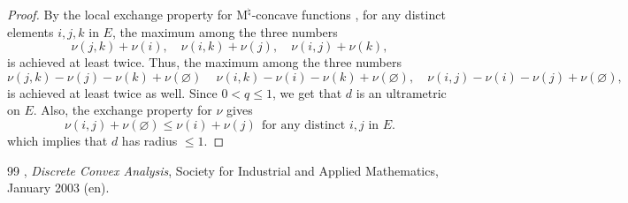 \documentclass[10pt,a4paper]{amsart}
\newcommand{\Mnat}{$\text{M}^\natural$}
\begin{document}
\begin{proof}
  By the local exchange property for \Mnat-concave functions \cite[Theorem 6.4]{Mu03}, for any distinct elements $i,j,k$ in $E$, the maximum among the three numbers
  \[
    \nu(j,k)+\nu(i), \quad \nu(i,k)+\nu(j), \quad \nu(i,j)+\nu(k),
  \]
  is achieved at least twice. Thus, the maximum among the three numbers
  \[
    \nu(j,k) -\nu(j)-\nu(k) + \nu(\varnothing)\, \quad \nu(i,k) -\nu(i)-\nu(k) + \nu(\varnothing), \quad \nu(i,j) -\nu(i)-\nu(j) + \nu(\varnothing),
  \]
  is achieved at least twice as well. Since $0 < q \leq 1$, we get that $d$ is an ultrametric on $E$. 
  Also, the exchange property for $\nu$ gives
  \[
\nu(i,j)+\nu(\varnothing) \le \nu(i)+\nu(j) \ \ \text{for any distinct $i, j$ in $E$.}
  \]
which implies that $d$ has radius $\le 1$.
\end{proof}

\begin{thebibliography}{99}
 \bysame, \emph{Discrete {Convex} {Analysis}}, Society for Industrial and Applied Mathematics, January 2003 (en).
\end{thebibliography}
\end{document}
